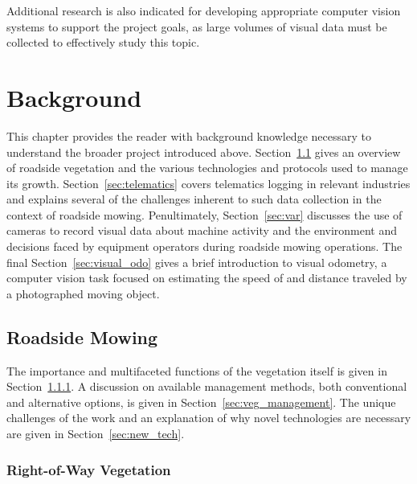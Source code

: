 \documentclass[
]{article}
\begin{document}
Additional research is also indicated for developing appropriate
computer vision systems to support the project goals, as large volumes
of visual data must be collected to effectively study this topic.

\clearpage

\chapter{Background}\label{background}

This chapter provides the reader with background knowledge necessary to
understand the broader project introduced above. Section~\ref{sec:veg}
gives an overview of roadside vegetation and the various technologies
and protocols used to manage its growth. Section~\ref{sec:telematics}
covers telematics logging in relevant industries and explains several of
the challenges inherent to such data collection in the context of
roadside mowing. Penultimately, Section~\ref{sec:var} discusses the use
of cameras to record visual data about machine activity and the
environment and decisions faced by equipment operators during roadside
mowing operations. The final Section~\ref{sec:visual_odo} gives a brief
introduction to visual odometry, a computer vision task focused on
estimating the speed of and distance traveled by a photographed moving
object.

\section{Roadside Mowing}\label{sec:veg}

The importance and multifaceted functions of the vegetation itself is
given in Section~\ref{sec:row_veg}. A discussion on available management
methods, both conventional and alternative options, is given in
Section~\ref{sec:veg_management}. The unique challenges of the work and
an explanation of why novel technologies are necessary are given in
Section~\ref{sec:new_tech}.

\subsection{Right-of-Way Vegetation}\label{sec:row_veg}
\end{document}

